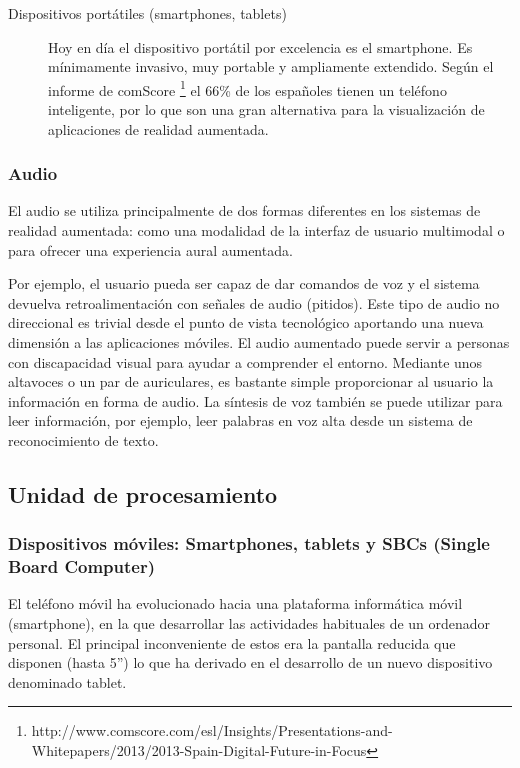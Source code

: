 \begin{description}
\item[Dispositivos portátiles (smartphones, tablets)]
  Hoy en día el dispositivo portátil por excelencia es el smartphone. Es mínimamente invasivo, muy portable y ampliamente extendido. Según el informe de comScore \footnote{http://www.comscore.com/esl/Insights/Presentations-and-Whitepapers/2013/2013-Spain-Digital-Future-in-Focus} el 66\% de los españoles tienen un teléfono inteligente, por lo que son una gran alternativa para la visualización de aplicaciones de realidad aumentada.
\end{description}

\subsubsection{Audio}
El audio se utiliza principalmente de dos formas diferentes en los sistemas de realidad aumentada: como una modalidad de la interfaz de usuario multimodal o para ofrecer una experiencia aural aumentada. 

Por ejemplo, el usuario pueda ser capaz de dar comandos de voz y el sistema devuelva retroalimentación con señales de audio (pitidos). Este tipo de audio no direccional es trivial desde el punto de vista tecnológico aportando una nueva dimensión a las aplicaciones móviles. El audio aumentado puede servir a personas con discapacidad visual para ayudar a comprender el entorno. Mediante unos altavoces o un par de auriculares, es bastante simple proporcionar al usuario la información en forma de audio. La síntesis de voz también se puede utilizar para leer información, por ejemplo, leer palabras en voz alta desde un sistema de reconocimiento de texto.

\subsection{Unidad de procesamiento}
\subsubsection{Dispositivos móviles: Smartphones,  tablets y SBCs (Single Board Computer)}

El teléfono móvil ha evolucionado hacia una plataforma informática móvil (smartphone), en la que desarrollar las actividades habituales de un ordenador personal. El principal inconveniente de estos era la pantalla reducida que disponen (hasta 5”) lo que ha derivado en el desarrollo de un nuevo dispositivo denominado tablet. 

